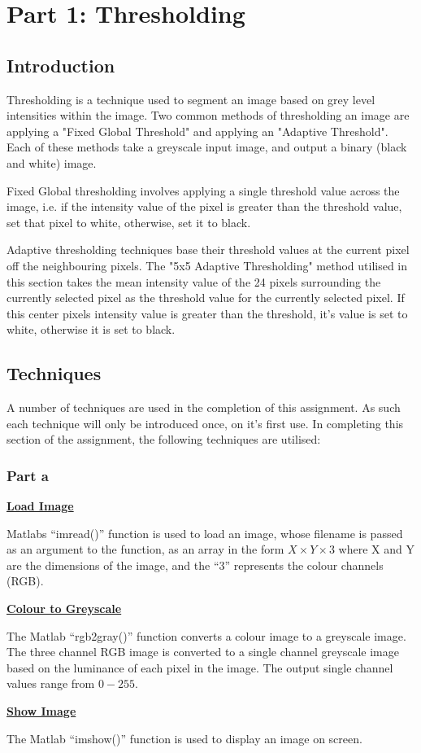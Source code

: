 \documentclass[a4paper]{article}
\begin{document}
	\section{Part 1: Thresholding}
	\subsection{Introduction}
	Thresholding is a technique used to segment an image based on grey level
	intensities within the image. Two common methods of thresholding an
	image are applying a "Fixed Global Threshold" and applying an "Adaptive
	Threshold". Each of these methods take a greyscale input image, and
	output a binary (black and white) image.
	\par Fixed Global thresholding involves applying a single threshold value
	across the image, i.e. if the intensity value of the pixel is greater
	than the threshold value, set that pixel to white, otherwise, set it to
	black.
	\par Adaptive thresholding techniques base their threshold values at the
	current pixel off the neighbouring pixels. The "5x5 Adaptive
	Thresholding" method utilised in this section takes the mean intensity
	value of the 24 pixels surrounding the currently selected pixel as the
	threshold value for the currently selected pixel. If this center pixels
	intensity value is greater than the threshold, it's value is set to
	white, otherwise it is set to black.
	\subsection{Techniques}
	A number of techniques are used in the completion of this assignment. As
	such each technique will only be introduced once, on it's first use. In
	completing this section of the assignment, the following techniques
	are utilised:
	\subsubsection{Part a}
	\underline{\textbf{Load Image}}
	\par Matlabs ``imread()'' function is used to load an image, whose filename
	is passed as an argument to the function, as an array in the form
	$X \times Y \times 3$ where X and Y are the dimensions of the image, and
	the ``3'' represents the colour channels (RGB).
	\par \underline{\textbf{Colour to Greyscale}}
	\par The Matlab ``rgb2gray()'' function converts a colour image to a
	greyscale image. The three channel RGB image is converted to a single
	channel greyscale image based on the luminance of each pixel in the
	image. The output single channel values range from $0-255$.
	\par\underline{\textbf{Show Image}}
	\par The Matlab ``imshow()'' function is used to display an image on
	screen.
\end{document}
